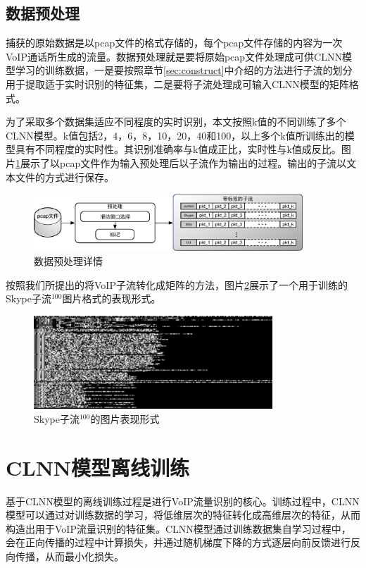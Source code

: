 \subsection{数据预处理}
捕获的原始数据是以pcap文件的格式存储的，每个pcap文件存储的内容为一次VoIP通话所生成的流量。数据预处理就是要将原始pcap文件处理成可供CLNN模型学习的训练数据，一是要按照章节\ref{sec:construct}中介绍的方法进行子流的划分用于提取适于实时识别的特征集，二是要将子流处理成可输入CLNN模型的矩阵格式。

为了采取多个数据集适应不同程度的实时识别，本文按照k值的不同训练了多个CLNN模型。k值包括2，4，6，8，10，20，40和100，以上多个k值所训练出的模型具有不同程度的实时性。其识别准确率与k值成正比，实时性与k值成反比。图片\ref{fig:datasetprocessing}展示了以pcap文件作为输入预处理后以子流作为输出的过程。输出的子流以文本文件的方式进行保存。

\begin{figure}[htp]
\begin{center}
\includegraphics[width=0.9\textwidth]{figures/datasetprocessing.eps}
\caption{数据预处理详情}\label{fig:datasetprocessing}
\end{center}
\end{figure}



按照我们所提出的将VoIP子流转化成矩阵的方法，图片\ref{fig:skype1}展示了一个用于训练的Skype子流$^{100}$图片格式的表现形式。

\begin{figure}[htp]
\begin{center}
\includegraphics[width=0.8\textwidth]{figures/skype1.png}
\caption{Skype子流$^{100}$的图片表现形式}\label{fig:skype1}
\end{center}
\end{figure}

\section{CLNN模型离线训练}
基于CLNN模型的离线训练过程是进行VoIP流量识别的核心。训练过程中，CLNN模型可以通过对训练数据的学习，将低维层次的特征转化成高维层次的特征，从而构造出用于VoIP流量识别的特征集。CLNN模型通过训练数据集自学习过程中，会在正向传播的过程中计算损失，并通过随机梯度下降的方式逐层向前反馈进行反向传播，从而最小化损失。

